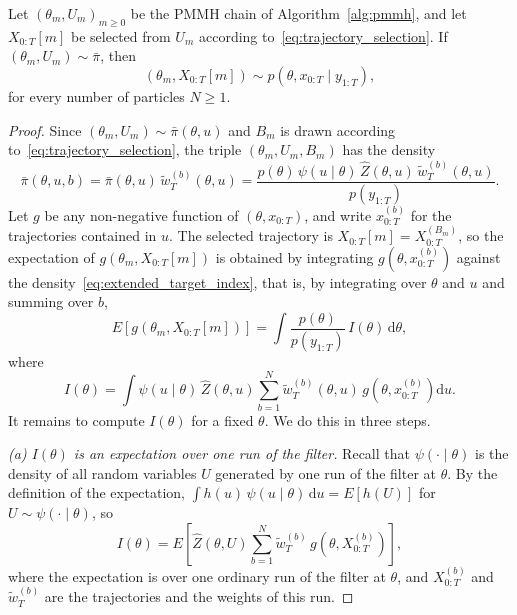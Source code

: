 \begin{theorem}
    \label{thm:pmmh_joint}
    Let $(\theta_m,U_m)_{m\ge0}$ be the PMMH chain of Algorithm~\ref{alg:pmmh}, and let $X_{0:T}[m]$ be selected from $U_m$ according to~\eqref{eq:trajectory_selection}. If $(\theta_m,U_m)\sim\bar{\pi}$, then
    \begin{equation}
        \left(\theta_m,X_{0:T}[m]\right)\sim p(\theta,x_{0:T}\mid y_{1:T}),
    \end{equation}
    for every number of particles $N\ge1$.
\end{theorem}
\begin{proof}
    Since $(\theta_m,U_m)\sim\bar{\pi}(\theta,u)$ and $B_m$ is drawn according to~\eqref{eq:trajectory_selection}, the triple $(\theta_m,U_m,B_m)$ has the density
    \begin{equation}
        \bar{\pi}(\theta,u,b) = \bar{\pi}(\theta,u)\,\tilde{w}_T^{(b)}(\theta,u) = \frac{p(\theta)\,\psi(u\mid\theta)\,\hat{Z}(\theta,u)\,\tilde{w}_T^{(b)}(\theta,u)}{p(y_{1:T})}.
        \label{eq:extended_target_index}
    \end{equation}
    Let $g$ be any non-negative function of $(\theta,x_{0:T})$, and write $x_{0:T}^{(b)}$ for the trajectories contained in $u$. The selected trajectory is $X_{0:T}[m] = X_{0:T}^{(B_m)}$, so the expectation of $g(\theta_m,X_{0:T}[m])$ is obtained by integrating $g(\theta,x_{0:T}^{(b)})$ against the density~\eqref{eq:extended_target_index}, that is, by integrating over $\theta$ and $u$ and summing over $b$,
    \begin{equation}
        E\left[g\left(\theta_m,X_{0:T}[m]\right)\right] = \int\frac{p(\theta)}{p(y_{1:T})}\,I(\theta)\,\mathrm{d}\theta,
        \label{eq:pmmh_trajectory_expectation}
    \end{equation}
    where
    \begin{equation}
        I(\theta) = \int\psi(u\mid\theta)\,\hat{Z}(\theta,u)\sum_{b=1}^{N}\tilde{w}_T^{(b)}(\theta,u)\,g\left(\theta,x_{0:T}^{(b)}\right)\mathrm{d}u.
        \label{eq:pmmh_trajectory_inner}
    \end{equation}
    It remains to compute $I(\theta)$ for a fixed $\theta$. We do this in three steps.

    \emph{(a) $I(\theta)$ is an expectation over one run of the filter.} Recall that $\psi(\cdot\mid\theta)$ is the density of all random variables $U$ generated by one run of the filter at $\theta$. By the definition of the expectation, $\int h(u)\,\psi(u\mid\theta)\,\mathrm{d}u = E[h(U)]$ for $U\sim\psi(\cdot\mid\theta)$, so
    \begin{equation}
        I(\theta) = E\left[\hat{Z}(\theta,U)\sum_{b=1}^{N}\tilde{w}_T^{(b)}\,g\left(\theta,X_{0:T}^{(b)}\right)\right],
    \end{equation}
    where the expectation is over one ordinary run of the filter at $\theta$, and $X_{0:T}^{(b)}$ and $\tilde{w}_T^{(b)}$ are the trajectories and the weights of this run.


\end{proof}
